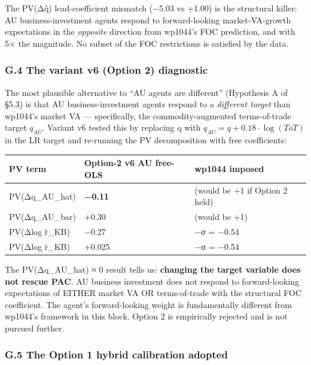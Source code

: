 \documentclass[
]{article}
\newcounter{none} %
\begin{document}
The PV(Δq̂) lead-coefficient mismatch (−5.03 vs +1.00) is the structural
killer: AU business-investment agents respond to forward-looking
market-VA-growth expectations in the \emph{opposite} direction from
wp1044's FOC prediction, and with 5× the magnitude. No subset of the FOC
restrictions is satisfied by the data.

\subsubsection{G.4 The variant v6 (Option 2)
diagnostic}\label{g.4-the-variant-v6-option-2-diagnostic}

The most plausible alternative to ``AU agents are different''
(Hypothesis A of §5.3) is that AU business-investment agents respond to
a \emph{different target} than wp1044's market VA --- specifically, the
commodity-augmented terms-of-trade target \(q_{AU}\). Variant v6 tested
this by replacing q with \(q_{AU} = q + 0.18 \cdot \log(ToT)\) in the LR
target and re-running the PV decomposition with free coefficients:

{\def\LTcaptype{none} %
\begin{longtable}[]{@{}lll@{}}
\toprule\noalign{}
PV term & Option-2 v6 AU free-OLS & wp1044 imposed \\
\midrule\noalign{}
\endhead
\bottomrule\noalign{}
\endlastfoot
PV(Δq\_AU\_hat) & \textbf{−0.11} & (would be +1 if Option 2 held) \\
PV(Δq\_AU\_bar) & +0.30 & (would be +1) \\
PV(Δlog r̂\_KB) & −0.27 & −σ = −0.54 \\
PV(Δlog r̄\_KB) & +0.025 & −σ = −0.54 \\
\end{longtable}
}

The PV(Δq\_AU\_hat) ≈ 0 result tells us: \textbf{changing the target
variable does not rescue PAC}. AU business investment does not respond
to forward-looking expectations of EITHER market VA OR terms-of-trade
with the structural FOC coefficient. The agent's forward-looking weight
is fundamentally different from wp1044's framework in this block. Option
2 is empirically rejected and is not pursued further.

\subsubsection{G.5 The Option 1 hybrid calibration
adopted}\label{g.5-the-option-1-hybrid-calibration-adopted}
\end{document}
